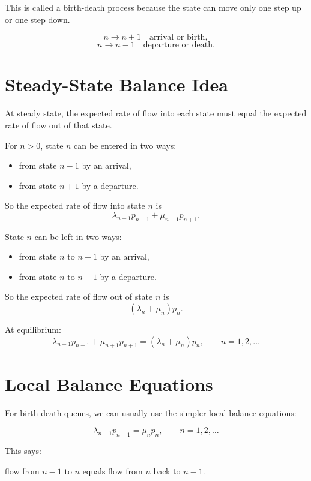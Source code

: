 \documentclass[12pt]{article}
\begin{document}
This is called a birth-death process because the state can move only one step up or one step down.

\[
n\to n+1 \quad \text{arrival or birth},
\]
\[
n\to n-1 \quad \text{departure or death}.
\]

\section{Steady-State Balance Idea}

At steady state, the expected rate of flow into each state must equal the expected rate of flow out of that state.

For \(n>0\), state \(n\) can be entered in two ways:

\begin{itemize}
    \item from state \(n-1\) by an arrival,
    \item from state \(n+1\) by a departure.
\end{itemize}

So the expected rate of flow into state \(n\) is
\[
\lambda_{n-1}p_{n-1}+\mu_{n+1}p_{n+1}.
\]

State \(n\) can be left in two ways:

\begin{itemize}
    \item from state \(n\) to \(n+1\) by an arrival,
    \item from state \(n\) to \(n-1\) by a departure.
\end{itemize}

So the expected rate of flow out of state \(n\) is
\[
(\lambda_n+\mu_n)p_n.
\]

At equilibrium:
\[
\boxed{
\lambda_{n-1}p_{n-1}+\mu_{n+1}p_{n+1}
=
(\lambda_n+\mu_n)p_n,\qquad n=1,2,\ldots
}
\]

\section{Local Balance Equations}

For birth-death queues, we can usually use the simpler local balance equations:

\[
\boxed{
\lambda_{n-1}p_{n-1}=\mu_np_n,\qquad n=1,2,\ldots
}
\]

This says:

\begin{center}
flow from \(n-1\) to \(n\) equals flow from \(n\) back to \(n-1\).
\end{center}
\end{document}

